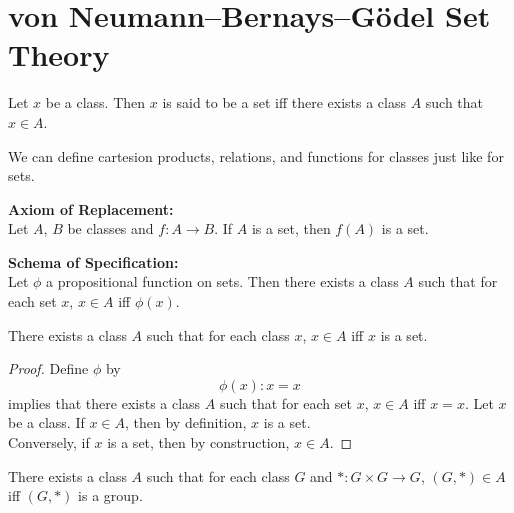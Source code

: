\documentclass{book}
\begin{document}
	\section{von Neumann–Bernays–Gödel Set Theory}
	
	\begin{defn}  
		Let $x$ be a class. Then $x$ is said to be a set iff there exists a class $A$ such that $x \in A$. 
	\end{defn}

	\begin{note}
		We can define cartesion products, relations, and functions for classes just like for sets. 
	\end{note}
	
	\begin{ax}  \textbf{Axiom of Replacement:}  \\
		Let $A$, $B$ be classes and $f:A \rightarrow B$. If $A$ is a set, then $f(A)$ is a set. 
	\end{ax}

	\begin{ax}  \textbf{Schema of Specification:}  \\
		Let $\phi$ a propositional function on sets. Then there exists a class $A$ such that for each set $x$, $x \in A$ iff $\phi(x)$. 
	\end{ax}
	
	\begin{ex} 
		There exists a class $A$ such that for each class $x$, $x \in A$ iff $x$ is a set.
	\end{ex}
	
	\begin{proof}
		Define $\phi$ by $$\phi(x) : x = x$$ 
		 implies that there exists a class $A$ such that for each set $x$, $x \in A$ iff $x = x$. Let $x$ be a class. If $x \in A$, then by definition, $x$ is a set. \\
		Conversely, if $x$ is a set, then by construction, $x \in A$.
	\end{proof}
	
	\begin{ex} 
		There exists a class $A$ such that for each class $G$ and $*: G \times G \rightarrow G$, $(G, *) \in A$ iff $(G, *)$ is a group.
	\end{ex}
	
\end{document}
